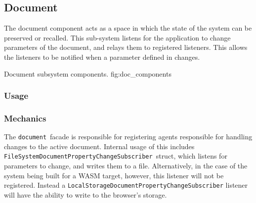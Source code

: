 \newcommand{\docarea}[3]{
    \index{#1}\pbodyitem{#2}{#3}
}

\newcommand{\extparamref}[3]{
    \index{#1}\pbodyitem{#2}{#3}
}

\newcommand{\dmod}{\texttt{document}}
\newcommand{\dftype}{\texttt{Facade}}
\newcommand{\dffspcstype}{\texttt{FileSystemDocumentPropertyChangeSubscriber}}
\newcommand{\dflspcstype}{\texttt{LocalStorageDocumentPropertyChangeSubscriber}}

\subsection{Document}
The document component acts as a space in which the state of the system can be preserved or recalled.
This sub-system listens for the application to change parameters of the document, and relays them to registered listeners.
This allows the listeners to be notified when a parameter defined in  changes.

{Document subsystem components.}
{fig:doc_components}


\subsubsection{Usage}


\subsubsection{Mechanics}
The \dmod\ facade is responsible for registering agents responsible for handling changes to the active document.
Internal usage of this includes \dffspcstype\ struct, which listens for parameters to change, and writes them to a file.
Alternatively, in the case of the system being built for a WASM target, however, this listener will not be registered.
Instead a \dflspcstype{} listener will have the ability to write to the browser's storage.